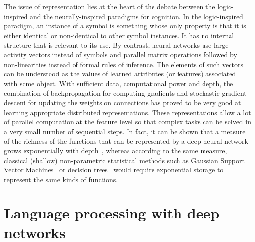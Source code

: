 \documentclass[10pts]{article}
\begin{document}
The issue of representation lies at the heart of the debate between
the logic-inspired and the neurally-inspired paradigms for
cognition. In the logic-inspired paradigm, an instance of a symbol is
something whose only property is that it is either identical or
non-identical to other symbol instances. It has no internal structure
that is relevant to its use. By contrast, neural networks use large
activity vectors instead of symbols and parallel matrix operations
followed by non-linearities instead of formal rules of inference. The
elements of such vectors can be understood as the values of learned
attributes (or features) associated with some object.  With sufficient
data, computational power and depth, the combination of
backpropagation for computing gradients and stochastic gradient
descent for updating the weights on connections has proved to be very
good at learning appropriate distributed representations. These
representations allow a lot of parallel computation at the feature
level so that complex tasks can be solved in a very small number of
sequential steps. In fact, it can be shown that a measure of the
richness of the functions that can be represented by a deep neural
network grows exponentially with
depth~\citep{Montufar-et-al-NIPS2014}, whereas according to the same
measure, classical (shallow) non-parametric statistical methods such
as Gaussian Support Vector
Machines~\citep{Bengio-localfailure-NIPS-2006-small} or decision
trees~\citep{Bengio-decision-trees10} would require exponential
storage
to represent the same kinds of functions.

\section{Language processing with deep networks}

\end{document}
